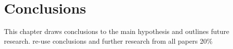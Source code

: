 \chapter{Conclusions}

This chapter draws conclusions to the main hypothesis and outlines future research.
re-use conclusions and further research from all papers
20\%
